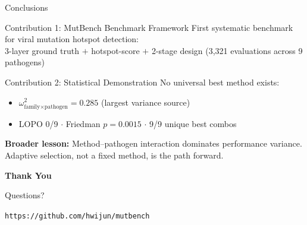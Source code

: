 \documentclass[aspectratio=169,11pt]{beamer}
\begin{document}
\begin{frame}{Conclusions}

\begin{block}{\textcolor{stage1blue}{Contribution 1: MutBench Benchmark Framework}}
First systematic benchmark for viral mutation hotspot detection:\\
3-layer ground truth $+$ hotspot-score $+$ 2-stage design (3,321 evaluations across 9 pathogens)
\end{block}

\vspace{0.5em}

\begin{block}{\textcolor{stage2orange}{Contribution 2: Statistical Demonstration}}
No universal best method exists:
\begin{itemize}
  \item $\omega^2_{\text{family}\times\text{pathogen}} = 0.285$ (largest variance source)
  \item LOPO 0/9 $\cdot$ Friedman $p = 0.0015$ $\cdot$ 9/9 unique best combos
\end{itemize}
\end{block}

\vspace{0.5em}

\begin{center}
\colorbox{pahdgreen!10}{\parbox{0.85\textwidth}{\centering
\textbf{\textcolor{pahdgreen}{Broader lesson:}} Method--pathogen interaction dominates performance variance.\\
Adaptive selection, not a fixed method, is the path forward.
}}
\end{center}
\end{frame}

\begin{frame}[plain]

\begin{center}
\vspace{2cm}
{\Huge\bfseries Thank You}

\vspace{1.5cm}
{\Large Questions?}

\vspace{1.5cm}
{\normalsize
\texttt{https://github.com/hwijun/mutbench}
}
\end{center}
\end{frame}
\end{document}
